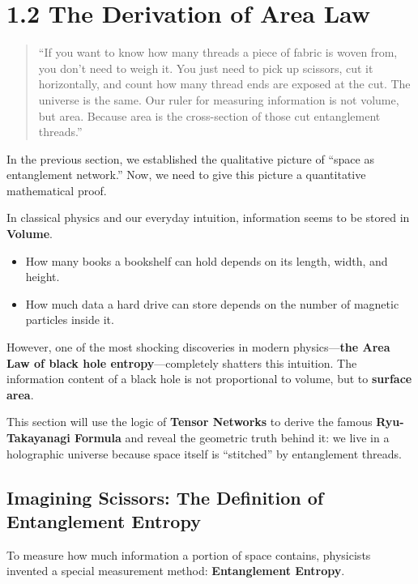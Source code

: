\section{1.2 The Derivation of Area Law}

\begin{quote}
``If you want to know how many threads a piece of fabric is woven from, you don't need to weigh it. You just need to pick up scissors, cut it horizontally, and count how many thread ends are exposed at the cut. The universe is the same. Our ruler for measuring information is not volume, but area. Because area is the cross-section of those cut entanglement threads.''
\end{quote}

In the previous section, we established the qualitative picture of ``space as entanglement network.'' Now, we need to give this picture a quantitative mathematical proof.

In classical physics and our everyday intuition, information seems to be stored in \textbf{Volume}.

\begin{itemize}
\item How many books a bookshelf can hold depends on its length, width, and height.

\item How much data a hard drive can store depends on the number of magnetic particles inside it.
\end{itemize}

However, one of the most shocking discoveries in modern physics---\textbf{the Area Law of black hole entropy}---completely shatters this intuition. The information content of a black hole is not proportional to volume, but to \textbf{surface area}.

This section will use the logic of \textbf{Tensor Networks} to derive the famous \textbf{Ryu-Takayanagi Formula} and reveal the geometric truth behind it: we live in a holographic universe because space itself is ``stitched'' by entanglement threads.

\subsection{Imagining Scissors: The Definition of Entanglement Entropy}

To measure how much information a portion of space contains, physicists invented a special measurement method: \textbf{Entanglement Entropy}.

